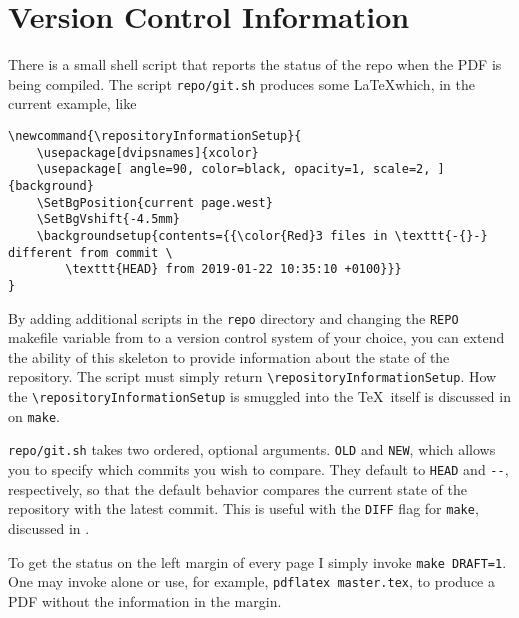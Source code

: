 \section{Version Control Information}\label{sec:vc}

There is a small shell script that reports the status of the repo when the PDF is being compiled.
The script \texttt{repo/git.sh} produces some \LaTeX which, in the current example, like
\begin{verbatim}
\newcommand{\repositoryInformationSetup}{
    \usepackage[dvipsnames]{xcolor}
    \usepackage[ angle=90, color=black, opacity=1, scale=2, ]{background}
    \SetBgPosition{current page.west}
    \SetBgVshift{-4.5mm}
    \backgroundsetup{contents={{\color{Red}3 files in \texttt{-{}-} different from commit \
        \texttt{HEAD} from 2019-01-22 10:35:10 +0100}}}
}
\end{verbatim}

By adding additional scripts in the \texttt{repo} directory and changing the \texttt{REPO} makefile variable from \git to a version control system of your choice, you can extend the ability of this skeleton to provide information about the state of the repository.
The script must simply return \texttt{{\textbackslash}repositoryInformationSetup}.
How the \texttt{{\textbackslash}repositoryInformationSetup} is smuggled into the \TeX\ itself is discussed in  on \texttt{make}.

\texttt{repo/git.sh} takes two ordered, optional arguments.  \texttt{OLD} and \texttt{NEW}, which allows you to specify which commits you wish to compare.  They default to \texttt{HEAD} and \texttt{-{}-}, respectively, so that the default behavior compares the current state of the repository with the latest commit.  This is useful with the \texttt{DIFF} flag for \texttt{make}, discussed in .

To get the \git status on the left margin of every page I simply invoke \texttt{make DRAFT=1}.
One may invoke \make alone or use, for example, \texttt{pdflatex master.tex}, to produce a PDF without the \git information in the margin.
